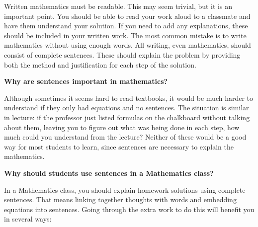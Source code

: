 %
%
%
%
%
%

       
Written mathematics must be readable. This may seem trivial, but it is
an important point. You should be able to read your work aloud to a
classmate and have them understand your solution. If you need to add
any explanations, these should be included in your written work.
The most common mistake is to write mathematics without using enough
words. All writing, even mathematics, should consist of complete sentences.
These should explain the problem by providing both the method and 
justification for each  step of the solution.


\begin{flushleft}
{\bf{Why are sentences important in mathematics?}}
\end{flushleft}

  Although sometimes it seems hard to read textbooks, it would be
much harder to understand if they only had equations and no sentences.
The situation is similar in lecture: if the professor just listed
formulas on the chalkboard without talking about them, leaving you to
figure out what was being done in each step, how much could you
understand from the lecture?  Neither of these would be a good way for
most students to learn, since sentences are necessary to explain the
mathematics.

\begin{flushleft}
  \bf{Why should students use sentences in a Mathematics class?}
\end{flushleft}

In a Mathematics class, you should explain homework solutions using complete
sentences.  That means linking together thoughts with words and
embedding equations into sentences.  Going through the extra work to
do this will benefit you in several ways:

